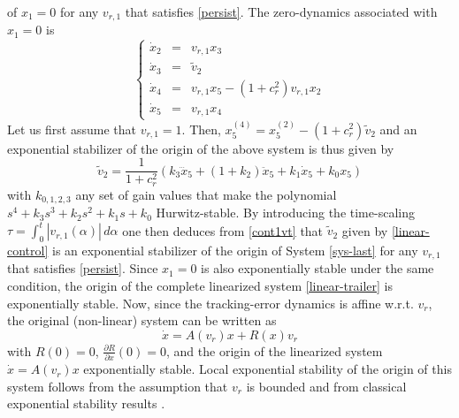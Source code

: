\documentclass[a4paper,twoside]{article}
\def \finproof{\hfill\hbox{\vrule width1.0ex height1.5ex}}
\begin{document}
of $x_1=0$ for any $v_{r,1}$ that satisfies \eqref{persist}. The zero-dynamics associated with $x_1=0$ is
\begin{equation}
\label{sys-last}
\left \{
\begin{array}{lcl}
\dot x_2 & = &  v_{r,1} x_3  \\
\dot x_3 & = & \tilde v_2 \\
\dot x_4 & = &  v_{r,1} x_5 -  (1+c_r^2)  v_{r,1} x_2 \\
\dot x_5 & = &  v_{r,1} x_4
\end{array}
\right.
\end{equation}
Let us first assume that $v_{r,1}=1$. Then, $x_5^{(4)} = x_5^{(2)} -(1+ c_r^2) \tilde v_2$ and an exponential stabilizer 
of the origin of the above system is thus given by
\begin{equation}
\label{cont1vt}
\tilde v_2 = \frac{1}{1+ c_r^2} \left( k_3 \dddot x_5 + (1+k_2) \ddot x_5 +k_1 \dot x_5 + k_0 x_5 \right)
\end{equation}
with $k_{0,1,2,3}$ any set of gain values that make the polynomial $s^4+k_3s^3+k_2 s^2 + k_1 s + k_0$ 
Hurwitz-stable. By introducing the time-scaling  $\tau = \int_0^t |v_{r,1}(\alpha)| \, d \alpha$ one then deduces
from \eqref{cont1vt} that $\tilde v_2$ given by \eqref{linear-control} is an exponential stabilizer of the origin 
of System \eqref{sys-last} for any $v_{r,1}$ that satisfies \eqref{persist}.
 Since $x_1=0$ is also exponentially stable under the same condition, the origin of the complete linearized 
system \eqref{linear-trailer} is 
exponentially stable. Now, since the tracking-error dynamics is affine w.r.t. $v_r$, the original (non-linear) system can
be written as
\[
\dot x = A(v_r) x +R(x) v_r
\]
with $R(0)= 0$, $\frac{\partial R}{\partial x}(0)=0$, and the origin of the linearized system $\dot x =A(v_r) x$ 
exponentially stable.
Local exponential stability of the origin of this system follows from the assumption that $v_r$ is bounded and 
from classical exponential stability results \cite[Th. 4.13]{kh02}. \finproof



% 
	\newpage
\end{document}
